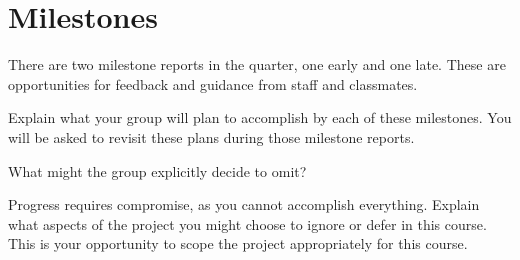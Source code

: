 \section{Milestones}

There are two milestone reports in the quarter, one early and one late. These are opportunities for feedback and guidance from staff and classmates.

Explain what your group will plan to accomplish by each of these milestones. You will be asked to revisit these plans during those milestone reports.

What might the group explicitly decide to omit?

Progress requires compromise, as you cannot accomplish everything. Explain what aspects of the project you might choose to ignore or defer in this course. This is your opportunity to scope the project appropriately for this course.

